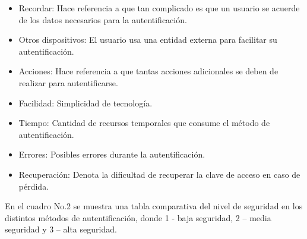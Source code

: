 \documentclass[12pt, a4paper, titlepage]{article}
\begin{document}
		\begin{itemize}
			\item Recordar: Hace referencia a que tan complicado es que un usuario se acuerde de los datos necesarios para la autentificación. 
			\item Otros dispositivos: El usuario usa una entidad externa para facilitar su autentificación.
			\item Acciones: Hace referencia a que tantas acciones adicionales se deben de realizar para autentificarse.
			\item Facilidad: Simplicidad de tecnología.
			\item Tiempo: Cantidad de recursos temporales que consume el método de autentificación.
			\item Errores: Posibles errores durante la autentificación. 
			\item Recuperación: Denota la dificultad de recuperar la clave de acceso en caso de pérdida.
		\end{itemize}
		
		En el cuadro No.2 se muestra una tabla comparativa del nivel de seguridad en los distintos métodos de autentificación, donde 1 - baja seguridad, 2 – media seguridad y 3 – alta seguridad.
		
\end{document}
